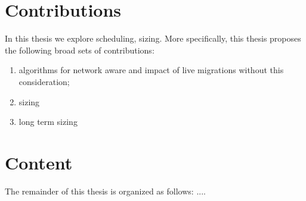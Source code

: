    
\section{Contributions}

In this thesis we explore scheduling, sizing. More specifically, this thesis proposes the following broad sets of contributions:

\begin{enumerate}
    \item algorithms for network aware and impact of live migrations without this consideration;
    
    \item sizing
    
    \item long term sizing
    
\end{enumerate}

\section{Content}

The remainder of this thesis is organized as follows: ....

